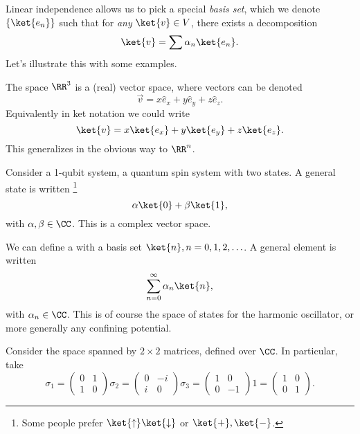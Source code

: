 Linear independence allows us to pick a special \emph{basis set}, which we denote $\set{\ket{e_n}}$ such that for \emph{any} $\ket{v}\in V$, there exists a decomposition
\begin{equation}
    \ket{v} =\sum \alpha_n \ket{e_n}.
\end{equation}
Let's illustrate this with some examples.

\begin{exm}
    The space $\RR^3$ is a (real) vector space, where vectors can be denoted
    \begin{equation}
        \vec{v}= x \hat e_x + y \hat e_y + z \hat e_z.
    \end{equation}
    Equivalently in ket notation we could write
    \begin{equation}
        \ket{v}= x \ket{e_x} + y \ket{e_y} + z \ket{e_z}.
    \end{equation}
    This generalizes in the obvious way to $\RR^n$.
\end{exm}
\begin{exm}
    Consider a 1-qubit system, a quantum spin system with two states. A general state is written%
        \footnote{Some people prefer $\ket{\uparrow}\ket{\downarrow}$ or $\ket{+},\ket{-}$.}
    \begin{equation}
        \alpha\ket{0} +\beta\ket{1},
    \end{equation}
    with $\alpha,\beta\in \CC$.
    This is a complex vector space.
\end{exm}
\begin{exm}
    We can define a  with a basis set $\ket{n},n=0,1,2,\ldots$. A general element is written
    \begin{equation}
        \sum_{n=0}^\infty \alpha_n \ket{n},
    \end{equation}
    with $\alpha_n\in \CC$. This is of course the space of states for the harmonic oscillator, or more generally any confining potential.
\end{exm}
\begin{exm}
    Consider the space spanned by $2\times 2$ matrices, defined over $\CC$. In particular, take
    \begin{equation}
        \sigma_1 =\begin{pmatrix}
            0 & 1\\
            1 & 0
        \end{pmatrix}
        \sigma_2= \begin{pmatrix}
            0 & -i\\
            i & 0
        \end{pmatrix}
        \sigma_3= \begin{pmatrix}
            1 & 0\\
            0 & -1
        \end{pmatrix}
        1=\begin{pmatrix}
            1 & 0\\
            0 & 1
        \end{pmatrix}.
    \end{equation}
\end{exm}
